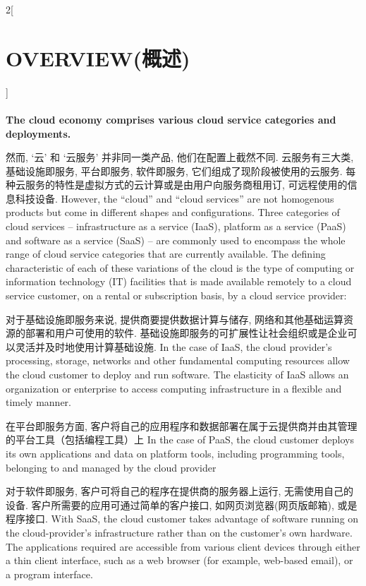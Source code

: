 \documentclass[a4paper, UTF8, 12pt]{article}
\begin{document}
\begin{paracol}{2}[\section{OVERVIEW(概述)}]
    \paragraph{}
    {\bfseries The cloud economy comprises various cloud service categories and deployments.}

    \switchcolumn*
    然而, `云' 和 `云服务' 并非同一类产品, 他们在配置上截然不同. 云服务有三大类, 基础设施即服务, 平台即服务, 软件即服务, 它们组成了现阶段被使用的云服务. 每种云服务的特性是虚拟方式的云计算或是由用户向服务商租用订, 可远程使用的信息科技设备.
    \switchcolumn
    However, the “cloud” and “cloud services” are not homogenous products but come in different shapes and configurations. Three categories of cloud services – infrastructure as a service (IaaS), platform as a service (PaaS) and software as a service (SaaS) – are commonly used to encompass the whole range of cloud service categories that are currently available. The defining characteristic of each of these variations of the cloud is the type of computing or information technology (IT) facilities that is made available remotely to a cloud service customer, on a rental or subscription basis, by a cloud service provider: 

    \switchcolumn*
    对于基础设施即服务来说, 提供商要提供数据计算与储存, 网络和其他基础运算资源的部署和用户可使用的软件. 基础设施即服务的可扩展性让社会组织或是企业可以灵活并及时地使用计算基础设施.
    \switchcolumn
    In the case of IaaS, the cloud provider’s processing, storage, networks and other fundamental computing resources allow the cloud customer to deploy and run software. The elasticity of IaaS allows an organization or enterprise to access computing infrastructure in a flexible and timely manner.  

    \switchcolumn*
    在平台即服务方面, 客户将自己的应用程序和数据部署在属于云提供商并由其管理的平台工具（包括编程工具）上
    \switchcolumn
    In the case of PaaS, the cloud customer deploys its own applications and data on platform tools, including programming tools, belonging to and managed by the cloud provider

    \switchcolumn*
    对于软件即服务, 客户可将自己的程序在提供商的服务器上运行, 无需使用自己的设备. 客户所需要的应用可通过简单的客户接口, 如网页浏览器(网页版邮箱), 或是程序接口.
    \switchcolumn
    With SaaS, the cloud customer takes advantage of software running on the cloud-provider’s infrastructure rather than on the customer’s own hardware. The applications required are accessible from various client devices through either a thin client interface, such as a web browser (for example, web-based email), or a program interface. 


\end{paracol}
\end{document}
